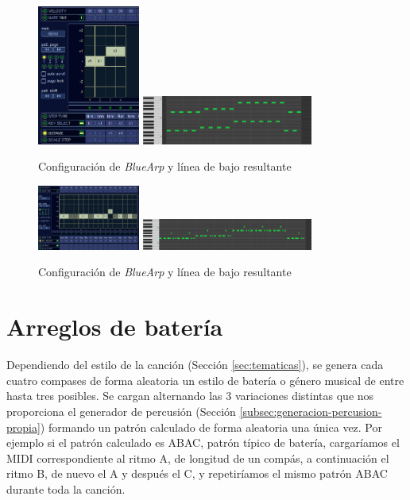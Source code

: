 \begin{figure}[h]
    \centering
    \includegraphics[width = 0.3\textwidth]{Imagenes/Bitmap/LineaDeBajo2.png}
    \includegraphics[width = 0.5\textwidth]{Imagenes/Bitmap/LineaDeBajo3.png}
    \caption{Configuración de \textit{BlueArp} y línea de bajo resultante}
    \label{fig:LineaDeBajo1}
\end{figure}

\begin{figure}[h]
    \centering
    \includegraphics[width = 0.3\textwidth]{Imagenes/Bitmap/LineaDeBajo4.png}
    \includegraphics[width = 0.5\textwidth]{Imagenes/Bitmap/LineaDeBajo5.png}
    \caption{Configuración de \textit{BlueArp} y línea de bajo resultante}
    \label{fig:LineaDeBajo2}
\end{figure}


\section{Arreglos de batería}
Dependiendo del estilo de la canción (Sección \ref{sec:tematicas}), se genera cada cuatro compases de forma aleatoria un estilo de batería o género musical de entre hasta tres posibles. Se cargan alternando las 3 variaciones distintas que nos proporciona el generador de percusión (Sección \ref{subsec:generacion-percusion-propia}) formando un patrón calculado de forma aleatoria una única vez. Por ejemplo si el patrón calculado es ABAC, patrón típico de batería, cargaríamos el MIDI correspondiente al ritmo A, de longitud de un compás, a continuación el ritmo B, de nuevo el A y después el C, y repetiríamos el mismo patrón ABAC durante toda la canción.

